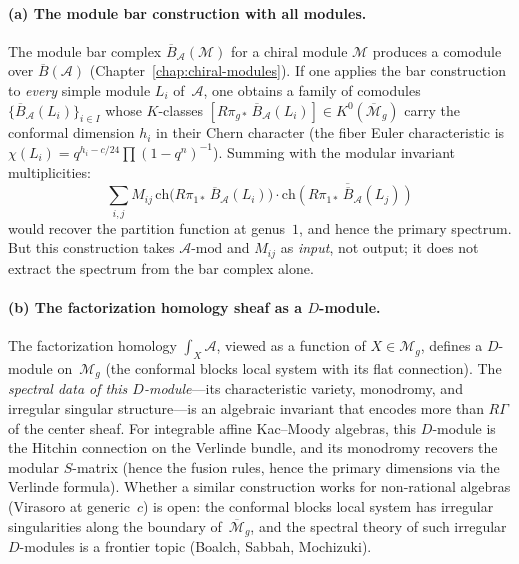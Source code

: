 \documentclass[11pt]{article}
\newcommand{\cA}{\mathcal{A}}
\newcommand{\cM}{\mathcal{M}}
\newcommand{\barB}{\overline{B}}
\begin{document}
\paragraph{(a) The module bar construction with all modules.}
The module bar complex
$\barB_\cA(\cM)$ for a chiral module $\cM$ produces a comodule
over $\barB(\cA)$
(Chapter~\ref{chap:chiral-modules}).  If one applies the bar
construction to \emph{every} simple module $L_i$ of~$\cA$, one
obtains a family of comodules $\{\barB_\cA(L_i)\}_{i \in I}$
whose $K$-classes
$[R\pi_{g*}\, \barB_\cA(L_i)] \in K^0(\overline{\cM}_g)$
carry the conformal dimension $h_i$ in their Chern character
(the fiber Euler characteristic is $\chi(L_i) = q^{h_i - c/24}
\prod (1-q^n)^{-1}$).  Summing with the modular invariant
multiplicities:
\[
\sum_{i,j} M_{ij}\,\mathrm{ch}\bigl(
R\pi_{1*}\, \barB_\cA(L_i)\bigr)
\cdot \overline{\mathrm{ch}(R\pi_{1*}\, \barB_\cA(L_j))}
\]
would recover the partition function at genus~$1$, and hence the
primary spectrum.  But this construction takes $\cA\text{-}\mathrm{mod}$
and $M_{ij}$ as \emph{input}, not output; it does not extract the
spectrum from the bar complex alone.

\paragraph{(b) The factorization homology sheaf as a $D$-module.}
The factorization homology $\int_X \cA$, viewed as a function of
$X \in \cM_g$, defines a $D$-module on~$\cM_g$ (the conformal blocks
local system with its flat connection).  The \emph{spectral data of
this $D$-module}---its characteristic variety, monodromy, and
irregular singular structure---is an algebraic invariant that encodes
more than $R\Gamma$ of the center sheaf.  For integrable affine
Kac--Moody algebras, this $D$-module is the Hitchin connection
on the Verlinde bundle, and its monodromy recovers the modular
$S$-matrix (hence the fusion rules, hence the primary dimensions
via the Verlinde formula).  Whether a similar construction works
for non-rational algebras (Virasoro at generic~$c$) is open:
the conformal blocks local system has irregular singularities
along the boundary of~$\overline{\cM}_g$, and the spectral
theory of such irregular $D$-modules is a frontier topic
(Boalch, Sabbah, Mochizuki).
\end{document}
